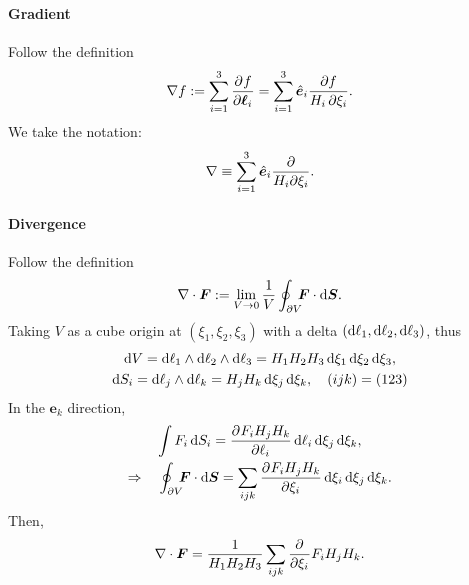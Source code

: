 \documentclass{article}
\newcommand{\ko}[1]{\hspace{-#1 pt}}
\begin{document}
\paragraph{Gradient} Follow the definition
$$\nabla f:=\sum_{i=1}^3\frac{\partial^{}f}{\partial{\bm\ell_i}^{}}=\sum_{i=1}^3\mathop{}\!\hat{\bm{e}}_i\frac{\partial f}{H_i\,\partial\xi_i}.$$
We take the notation:
$$\nabla\equiv\sum_{i=1}^3\mathop{}\!\hat{\bm{e}}_i\frac\partial{H_i\partial\xi_i}.$$
\paragraph{Divergence} Follow the definition
$$\div\bm F:=\lim_{V\to0}\frac1{V}\oint_{\partial V}\ko5\bm F\cdot\d\bm S.$$
Taking $V$ as a cube origin at $(\xi_1,\xi_2,\xi_3)$ with a delta $(\mathop{}\!\mathrm{d}\ell_1,\mathop{}\!\mathrm{d}\ell_2,\mathop{}\!\mathrm{d}\ell_3)$, thus
\begin{gather*}
	\d V=\d\ell_1\wedge\d\ell_2\wedge\d\ell_3=H_1H_2H_3\d\xi_1\d\xi_2\d\xi_3,\\
	\d S_i=\d\ell_j\wedge\d\ell_k=H_jH_k\d\xi_j\d\xi_k,\quad(ijk)=(123)
\end{gather*}
In the $\bm e_k$ direction,
\begin{gather*}
	\int F_i\d S_i=\pv{F_iH_jH_k}{\ell_i}\d\ell_i\d\xi_j\d\xi_k,\\
	\Rightarrow\quad\oint_{\partial V}\ko5\bm F\cdot\d\bm S=\sum_{ijk}\pv{F_iH_jH_k}{\xi_i}\d\xi_i\d\xi_j\d\xi_k.
\end{gather*}
Then,
$$\nabla\cdot\bm F=\frac1{H_1H_2H_3}\sum_{ijk}\frac{\partial^{}}{\partial{\xi_i}^{}}F_iH_jH_k.$$
\end{document}
